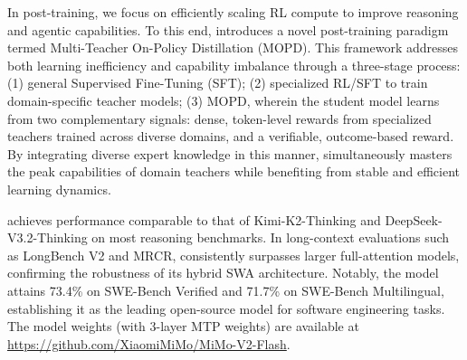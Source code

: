 In post-training, we focus on efficiently scaling RL compute to improve reasoning and agentic capabilities. To this end, \mimoflash{} introduces a novel post-training paradigm termed Multi-Teacher On-Policy Distillation (MOPD). This framework addresses both learning inefficiency and capability imbalance through a three-stage process: (1) general Supervised Fine-Tuning (SFT); (2) specialized RL/SFT to train domain-specific teacher models; (3) MOPD, wherein the student model learns from two complementary signals: dense, token-level rewards from specialized teachers trained across diverse domains, and a verifiable, outcome-based reward. By integrating diverse expert knowledge in this manner, \mimoflash{} simultaneously masters the peak capabilities of domain teachers while benefiting from stable and efficient learning dynamics.

\mimoflash{} achieves performance comparable
to that of Kimi-K2-Thinking and DeepSeek-V3.2-Thinking on most reasoning benchmarks.
In long-context evaluations such as LongBench V2 and MRCR, \mimoflash{} consistently surpasses larger full-attention models, confirming the robustness of its hybrid SWA architecture. Notably, the model attains 73.4\% on SWE-Bench Verified and 71.7\% on SWE-Bench Multilingual, establishing it as the leading open-source model for software engineering tasks.
The model weights (with 3-layer MTP weights) are available at 
\textcolor{xiaomiorange}{\url{https://github.com/XiaomiMiMo/MiMo-V2-Flash}}.
